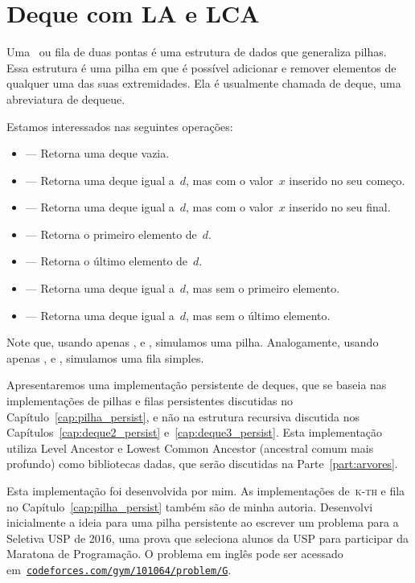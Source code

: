 \documentclass[main.tex]{subfiles}
\begin{document}
\chapter{Deque com LA e LCA} \label{cap:deque1_persist}

Uma~ ou fila de duas pontas é uma estrutura de dados que generaliza pilhas. Essa estrutura é uma pilha em que é possível adicionar e remover elementos de qualquer uma das suas extremidades. Ela é usualmente chamada de deque, uma abreviatura de dequeue.

Estamos interessados nas seguintes operações:

\begin{itemize}
	\item {} --- Retorna uma deque vazia.
	\item {} --- Retorna uma deque igual a~$d$, mas com o valor~$x$ inserido no seu começo.
	\item {} --- Retorna uma deque igual a~$d$, mas com o valor~$x$ inserido no seu final.
	\item {} --- Retorna o primeiro elemento de~$d$.
	\item {} --- Retorna o último elemento de~$d$.
	\item {} --- Retorna uma deque igual a~$d$, mas sem o primeiro elemento.
	\item {} --- Retorna uma deque igual a~$d$, mas sem o último elemento.
\end{itemize}

Note que, usando apenas ,  e , simulamos uma pilha. Analogamente, usando apenas ,  e , simulamos uma fila simples.

Apresentaremos uma implementação persistente de deques, que se baseia nas implementações de pilhas e filas persistentes discutidas no Capítulo~\ref{cap:pilha_persist}, e não na estrutura recursiva discutida nos Capítulos~\ref{cap:deque2_persist} e~\ref{cap:deque3_persist}. Esta implementação utiliza Level Ancestor e Lowest Common Ancestor (ancestral comum mais profundo) como bibliotecas dadas, que serão discutidas na Parte~\ref{part:arvores}.

Esta implementação foi desenvolvida por mim. As implementações de~\textsc{k-th} e fila no Capítulo~\ref{cap:pilha_persist} também são de minha autoria. Desenvolvi inicialmente a ideia para uma pilha persistente ao escrever um problema para a Seletiva USP de 2016, uma prova que seleciona alunos da USP para participar da Maratona de Programação. O problema em inglês pode ser acessado em~\href{http://codeforces.com/gym/101064/problem/G}{\texttt{codeforces.com/gym/101064/problem/G}}.
\end{document}
